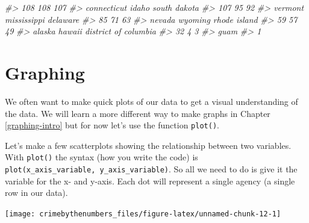\documentclass[
  12pt,
]{book}
\newenvironment{Shaded}{\begin{snugshade}}{\end{snugshade}}
\newcommand{\CommentTok}[1]{\textcolor[rgb]{0.37,0.37,0.37}{\textit{#1}}}
\newcommand{\KeywordTok}[1]{\textcolor[rgb]{0.27,0.27,0.27}{\textbf{#1}}}
\newcommand{\NormalTok}[1]{#1}
\newcommand{\OperatorTok}[1]{\textcolor[rgb]{0.43,0.43,0.43}{\textbf{#1}}}
\begin{document}
\begin{Shaded}
\begin{Highlighting}[]
\CommentTok{\#\textgreater{}                  108                  108                  107 }
\CommentTok{\#\textgreater{}          connecticut                idaho         south dakota }
\CommentTok{\#\textgreater{}                  107                   95                   92 }
\CommentTok{\#\textgreater{}              vermont          mississippi             delaware }
\CommentTok{\#\textgreater{}                   85                   71                   63 }
\CommentTok{\#\textgreater{}               nevada              wyoming         rhode island }
\CommentTok{\#\textgreater{}                   59                   57                   49 }
\CommentTok{\#\textgreater{}               alaska               hawaii district of columbia }
\CommentTok{\#\textgreater{}                   32                    4                    3 }
\CommentTok{\#\textgreater{}                 guam }
\CommentTok{\#\textgreater{}                    1}
\end{Highlighting}
\end{Shaded}

\hypertarget{graphing}{%
\section{Graphing}\label{graphing}}

We often want to make quick plots of our data to get a visual understanding of the data. We will learn a more different way to make graphs in Chapter \ref{graphing-intro} but for now let's use the function \texttt{plot()}.

Let's make a few scatterplots showing the relationship between two variables. With \texttt{plot()} the syntax (how you write the code) is \texttt{plot(x\_axis\_variable,\ y\_axis\_variable)}. So all we need to do is give it the variable for the x- and y-axis. Each dot will represent a single agency (a single row in our data).

\begin{Shaded}
\end{Shaded}

\begin{center}\texttt{[image: crimebythenumbers\_files/figure-latex/unnamed-chunk-12-1]} \end{center}
\end{document}

